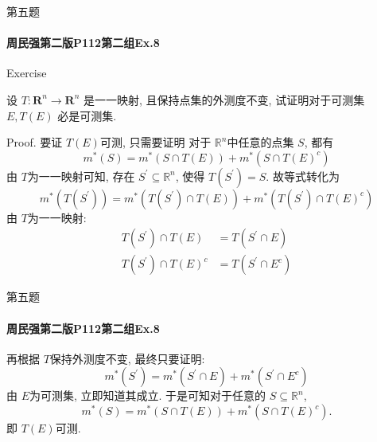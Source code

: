 \documentclass{beamer}
\begin{document}
\begin{frame}[fragile]{第五题}
\framesubtitle{周民强第二版P112第二组Ex.8 }

\begin{block}{Exercise}


设 $T: \mathbf{R}^n \to \mathbf{R}^n$ 是一一映射, 且保持点集的外测度不变, 试证明对于可测集 $E, T(E)$ 必是可测集.

\end{block}
Proof.  要证 \(  T\left( E \right)   \)可测, 只需要证明 对于 \(  \mathbb{R} ^{n}  \)中任意的点集 \(  S  \), 都有 \[
m^{*}\left( S \right)= m^{*}\left( S\cap T\left( E \right)  \right)+ m^{*}\left( S\cap T\left( E \right)^{c}   \right)   
\]   由 \(  T  \)为一一映射可知,  存在 \(  S^{\prime}   \subseteq \mathbb{R} ^{n}\), 使得 \(  T\left( S^{\prime}  \right)= S   \). 故等式转化为 \[
m^{*}\left( T\left( S^{\prime}  \right)  \right)= m^{*}\left( T\left( S^{\prime}  \right)\cap T\left( E \right)   \right)+ m^{*}\left( T\left( S^{\prime}  \right)\cap T\left( E \right)^{c}  \right)   
\]由 \(  T  \)为一一映射: \[
\begin{aligned}
T\left( S^{\prime}  \right)\cap T\left( E \right)&= T\left( S^{\prime} \cap E \right)\\ 
 T\left( S^{\prime}  \right)\cap T\left( E \right)^{c} &= T\left( S^{\prime} \cap E^{c} \right)       
\end{aligned}
\] 
\end{frame}    


\begin{frame}[fragile]{第五题}
\framesubtitle{周民强第二版P112第二组Ex.8 }
  再根据 \(  T  \)保持外测度不变, 最终只要证明: \[
m^{*}\left( S^{\prime}  \right)= m^{*}\left( S^{\prime} \cap E \right)+ m^{*}\left( S^{\prime} \cap E^{c} \right)   
\]由 \(  E  \)为可测集, 立即知道其成立. 于是可知对于任意的 \(  S\subseteq \mathbb{R} ^{n}  \), \[
m^{*}\left( S \right)= m^{*}\left( S\cap T\left( E \right)  \right)+ m^{*}\left( S\cap T\left( E \right)^{c} \right)   .
\]即 \(  T\left( E \right)   \)可测.   
\end{frame}    
\backmatter
\end{document}
